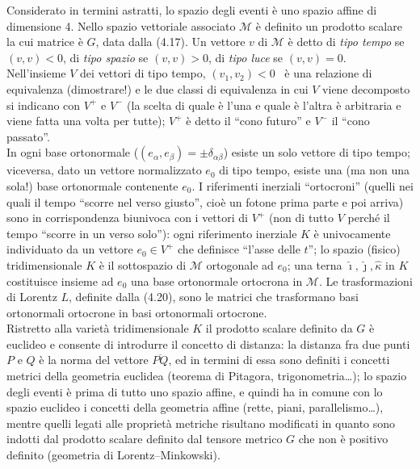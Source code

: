 Considerato in termini astratti, lo spazio degli eventi \`e uno spazio affine di
dimensione 4. Nello spazio vettoriale associato $\mathcal M$ \`e definito un
prodotto scalare la cui matrice \`e $G$, data dalla (4.17). Un vettore $v$ di
$\mathcal M$ \`e detto di \emph{tipo tempo} se $(v,v)<0$, di \emph{tipo spazio}
se $(v,v)>0$, di \emph{tipo luce} se $(v,v)=0$.\\
Nell'insieme $V$ dei vettori di tipo tempo, $(v_1,v_2)<0$ \ \`e una relazione di
equivalenza (dimostrare!) e le due classi di equivalenza in cui $V$ viene
decomposto si indicano con $V^+$ e $V^-$ (la scelta di quale \`e l'una e quale
\`e l'altra \`e arbitraria e viene fatta una volta per tutte); $V^+$ \`e detto
il ``cono futuro'' e $V^-$ il ``cono passato''.\\
In ogni base ortonormale \big($(e_\alpha,e_\beta)=\pm\delta_{\alpha\beta}$\big)
esiste un solo vettore di tipo tempo; viceversa, dato un vettore normalizzato
$e_0$ di tipo tempo, esiste una (ma non una sola!) base ortonormale contenente
$e_0$. I riferimenti inerziali ``ortocroni'' (quelli nei quali il tempo ``scorre
nel verso giusto'', cio\`e un fotone prima parte e poi arriva) sono in
corrispondenza biunivoca con i vettori di $V^+$ (non di tutto $V$ perch\'e il
tempo ``scorre in un verso solo''): ogni riferimento inerziale $K$ \`e
univocamente individuato da un vettore $e_0\in V^+$ che definisce ``l'asse delle
$t$''; lo spazio (fisico) tridimensionale $K$ \`e il sottospazio di $\mathcal M$
ortogonale ad $e_0$; una terna $\hat\imath,\hat\jmath,\hat\kappa$ in $K$
costituisce insieme ad $e_0$ una base ortonormale ortocrona in $\mathcal M$. Le
trasformazioni di Lorentz $L$, definite dalla (4.20), sono le matrici che
trasformano basi ortonormali ortocrone in basi ortonormali ortocrone.\\
Ristretto alla variet\`a tridimensionale $K$ il prodotto scalare definito da $G$
\`e euclideo e consente di introdurre il concetto di distanza: la distanza fra
due punti $P$ e $Q$ \`e
la norma del vettore $\overline{PQ}$, ed in termini di essa sono definiti i
concetti metrici della geometria euclidea (teorema di Pitagora,
trigonometria\dots); lo spazio degli eventi \`e prima di tutto uno spazio
affine, e quindi ha in comune con lo spazio euclideo i concetti della geometria
affine (rette, piani, parallelismo\dots), mentre quelli legati alle propriet\`a
metriche risultano modificati in quanto sono indotti dal prodotto scalare
definito dal tensore metrico $G$ che non \`e positivo definito (geometria di
Lorentz--Minkowski).\\
